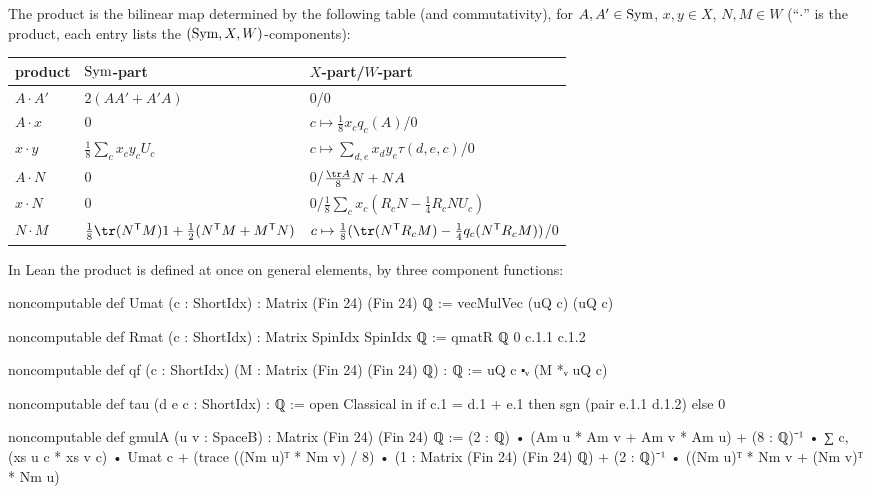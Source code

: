 \begin{definition}\label{ch21:def:gmul}
The product is the bilinear map determined by the following table (and commutativity), for
$A,A'\in\mathrm{Sym}$, $x,y\in X$, $N,M\in W$ (``$\cdot$'' is the product, each entry lists the
$(\mathrm{Sym},X,W)$-components):

\begin{center}\small
\begin{tabular}{lll}
\toprule
product & $\mathrm{Sym}$-part & $X$-part\quad/\quad $W$-part\\\midrule
$A\cdot A'$ & $2(AA'+A'A)$ & $0$\quad/\quad$0$\\
$A\cdot x$ & $0$ & $c\mapsto\tfrac18x_cq_c(A)$\quad/\quad$0$\\
$x\cdot y$ & $\tfrac18\sum_cx_cy_cU_c$ & $c\mapsto\sum_{d,e}x_dy_e\tau(d,e,c)$\quad/\quad$0$\\
$A\cdot N$ & $0$ & $0$\quad/\quad$\tfrac{\tr A}8N+NA$\\
$x\cdot N$ & $0$ & $0$\quad/\quad$\tfrac18\sum_cx_c(R_cN-\tfrac14R_cNU_c)$\\
$N\cdot M$ & $\tfrac18\tr(N^{\mathsf T}M)1+\tfrac12(N^{\mathsf T}M+M^{\mathsf T}N)$ &
  $c\mapsto\tfrac18(\tr(N^{\mathsf T}R_cM)-\tfrac14q_c(N^{\mathsf T}R_cM))$\quad/\quad$0$\\
\bottomrule
\end{tabular}
\end{center}
\end{definition}
In Lean the product is defined at once on general elements, by three component functions:
\begin{leancode}
noncomputable def Umat (c : ShortIdx) : Matrix (Fin 24) (Fin 24) ℚ := vecMulVec (uQ c) (uQ c)

noncomputable def Rmat (c : ShortIdx) : Matrix SpinIdx SpinIdx ℚ := qmatR ℚ 0 c.1.1 c.1.2

noncomputable def qf (c : ShortIdx) (M : Matrix (Fin 24) (Fin 24) ℚ) : ℚ :=
  uQ c ⬝ᵥ (M *ᵥ uQ c)

noncomputable def tau (d e c : ShortIdx) : ℚ :=
  open Classical in if c.1 = d.1 + e.1 then sgn (pair e.1.1 d.1.2) else 0
\end{leancode}
\begin{leancode}
noncomputable def gmulA (u v : SpaceB) : Matrix (Fin 24) (Fin 24) ℚ :=
  (2 : ℚ) • (Am u * Am v + Am v * Am u) + (8 : ℚ)⁻¹ • ∑ c, (xs u c * xs v c) • Umat c +
    (trace ((Nm u)ᵀ * Nm v) / 8) • (1 : Matrix (Fin 24) (Fin 24) ℚ) +
    (2 : ℚ)⁻¹ • ((Nm u)ᵀ * Nm v + (Nm v)ᵀ * Nm u)
\end{leancode}
